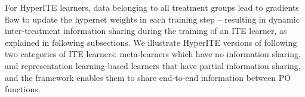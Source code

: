 \documentclass{article}
\begin{document}
For HyperITE learners, data belonging to all treatment groups lead to gradients flow to update the hypernet weights in each training step -- resulting in dynamic inter-treatment information sharing during the training of an ITE learner, as explained in following subsections.
We illustrate HyperITE versions of following two categories of ITE learners: meta-learners \cite{kunzel2019metalearners,curth2021nonparametric} which have no information sharing, and representation learning-based learners \cite{shalit2017estimating,chauhan2023adversarial} that have partial information sharing, and the framework enables them to share end-to-end information between PO functions.
\end{document}
